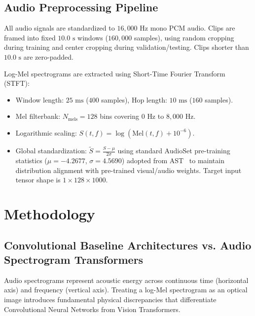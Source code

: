 \documentclass[11pt,a4paper]{article}
\begin{document}
\subsection{Audio Preprocessing Pipeline}
All audio signals are standardized to $16,000\text{ Hz}$ mono PCM audio. Clips are framed into fixed $10.0\text{ s}$ windows ($160,000$ samples), using random cropping during training and center cropping during validation/testing. Clips shorter than $10.0\text{ s}$ are zero-padded.

Log-Mel spectrograms are extracted using Short-Time Fourier Transform (STFT):
\begin{itemize}
    \item Window length: $25\text{ ms}$ ($400$ samples), Hop length: $10\text{ ms}$ ($160$ samples).
    \item Mel filterbank: $N_{\text{mels}} = 128$ bins covering $0\text{ Hz}$ to $8,000\text{ Hz}$.
    \item Logarithmic scaling: $S(t, f) = \log(\text{Mel}(t, f) + 10^{-6})$.
    \item Global standardization: $\tilde{S} = \frac{S - \mu}{2\sigma}$ using standard AudioSet pre-training statistics ($\mu = -4.2677$, $\sigma = 4.5690$) adopted from AST~\cite{gong2021ast} to maintain distribution alignment with pre-trained visual/audio weights. Target input tensor shape is $1 \times 128 \times 1000$.
\end{itemize}

\section{Methodology}

\subsection{Convolutional Baseline Architectures vs. Audio Spectrogram Transformers}
\label{sec:cnn_baselines}
Audio spectrograms represent acoustic energy across continuous time (horizontal axis) and frequency (vertical axis). Treating a log-Mel spectrogram as an optical image introduces fundamental physical discrepancies that differentiate Convolutional Neural Networks from Vision Transformers.
\end{document}

